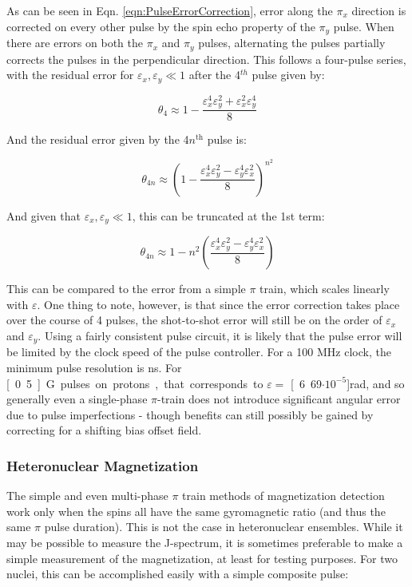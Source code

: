 \documentclass[PaulGanssle-Thesis.tex]{subfiles}
\begin{document}
As can be seen in Eqn. \ref{eqn:PulseErrorCorrection}, error along the $\pi_{x}$ direction is corrected on every other pulse by the spin echo property of the $\pi_{y}$ pulse. When there are errors on both the $\pi_{x}$ and $\pi_{y}$ pulses, alternating the pulses partially corrects the pulses in the perpendicular direction. This follows a four-pulse series, with the residual error for $\varepsilon_{x},\varepsilon_{y}\ll 1$ after the 4$^{th}$ pulse given by:

\begin{equation}
\theta_{4} \approx 1 - \frac{\varepsilon_{x}^{4}\varepsilon_{y}^2 + \varepsilon_{x}^{2}\varepsilon_{y}^{4}}{8}
\end{equation}

And the residual error given by the 4$n^\textrm{th}$ pulse is:

\begin{equation}
\theta_{4n} \approx \left(1-\frac{\varepsilon_{x}^4\varepsilon_{y}^2 - \varepsilon_{y}^4\varepsilon_{x}^2}{8}\right)^{n^2} 
\end{equation}

And given that $\varepsilon_{x},\varepsilon_{y}\ll1$, this can be truncated at the 1st term:

\begin{equation}
\theta_{4n} \approx 1-n^2\left(\frac{\varepsilon_{x}^4\varepsilon_{y}^2 - \varepsilon_{y}^4\varepsilon_{x}^2}{8}\right)
\end{equation}

This can be compared to the error from a simple $\pi$ train, which scales linearly with $\varepsilon$. One thing to note, however, is that since the error correction takes place over the course of 4 pulses, the shot-to-shot error will still be on the order of $\varepsilon_{x}$ and $\varepsilon_{y}$. Using a fairly consistent pulse circuit, it is likely that the pulse error will be limited by the clock speed of the pulse controller. For a 100 MHz clock, the minimum pulse resolution is \unit[10]{ns}. For \unit[0.5]{G} pulses on protons, that corresponds to $\varepsilon =$ \unit[6.69$\cdot 10^{-5}$]{rad}, and so generally even a single-phase $\pi$-train does not introduce significant angular error due to pulse imperfections - though benefits can still possibly be gained by correcting for a shifting bias offset field. 

\subsubsection{Heteronuclear Magnetization}
\label{nmr.signal.magnetization.heteronuclei}
The simple and even multi-phase $\pi$ train methods of magnetization detection work only when the spins all have the same gyromagnetic ratio (and thus the same $\pi$ pulse duration). This is not the case in heteronuclear ensembles. While it may be possible to measure the J-spectrum, it is sometimes preferable to make a simple measurement of the magnetization, at least for testing purposes. For two nuclei, this can be accomplished easily with a simple composite pulse:
\end{document}
